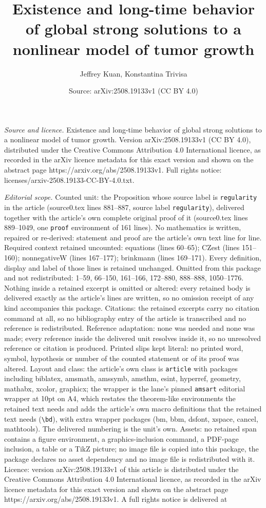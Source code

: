 \documentclass[10pt,a4paper]{amsart}
\title[Existence and long-time behavior of global strong solutions ]{Existence and long-time behavior of global strong solutions to a nonlinear model of tumor growth}
\author{Jeffrey Kuan, Konstantina Trivisa}
\date{Source: arXiv:2508.19133v1 (CC BY 4.0)}
\begin{document}
\maketitle

\noindent\emph{Source and licence.} Existence and long-time behavior of global strong solutions to a nonlinear model of tumor growth. Version arXiv:2508.19133v1 (CC BY 4.0), distributed under the Creative Commons Attribution 4.0 International licence, as recorded in the arXiv licence metadata for this exact version and shown on the abstract page https://arxiv.org/abs/2508.19133v1. Full rights notice: licenses/arxiv-2508.19133-CC-BY-4.0.txt.\par\smallskip

\noindent\textit{Editorial scope.} Counted unit: the Proposition whose source label is \texttt{regularity} in the article (source0.tex lines 881--887, source label \texttt{regularity}), delivered together with the article's own complete original proof of it (source0.tex lines 889--1049, one \texttt{proof} environment of 161 lines). No mathematics is written, repaired or re-derived: statement and proof are the article's own text line for line. Required context retained uncounted: equations (lines 60--65); CZest (lines 151--160); nonnegativeW (lines 167--177); brinkmann (lines 169--171). Every definition, display and label of those lines is retained unchanged. Omitted from this package and not redistributed: 1--59, 66--150, 161--166, 172--880, 888--888, 1050--1776. Nothing inside a retained excerpt is omitted or altered: every retained body is delivered exactly as the article's lines are written, so no omission receipt of any kind accompanies this package. Citations: the retained excerpts carry no citation command at all, so no bibliography entry of the article is transcribed and no reference is redistributed. Reference adaptation: none was needed and none was made; every reference inside the delivered unit resolves inside it, so no unresolved reference or citation is produced. Printed slips kept literal: no printed word, symbol, hypothesis or number of the counted statement or of its proof was altered. Layout and class: the article's own class is \texttt{article} with packages including biblatex, amsmath, amssymb, amsthm, esint, hyperref, geometry, mathabx, xcolor, graphicx; the wrapper is the lane's pinned \texttt{amsart} editorial wrapper at 10pt on A4, which restates the theorem-like environments the retained text needs and adds the article's own macro definitions that the retained text needs (\texttt{\textbackslash bd}), with extra wrapper packages (bm, bbm, dsfont, xspace, cancel, mathtools). The delivered numbering is the unit's own. Assets: no retained span contains a figure environment, a graphics-inclusion command, a PDF-page inclusion, a table or a TikZ picture; no image file is copied into this package, the package declares no asset dependency and no image file is redistributed with it. Licence: version arXiv:2508.19133v1 of this article is distributed under the Creative Commons Attribution 4.0 International licence, as recorded in the arXiv licence metadata for this exact version and shown on the abstract page https://arxiv.org/abs/2508.19133v1. A full rights notice is delivered at 
\end{document}
